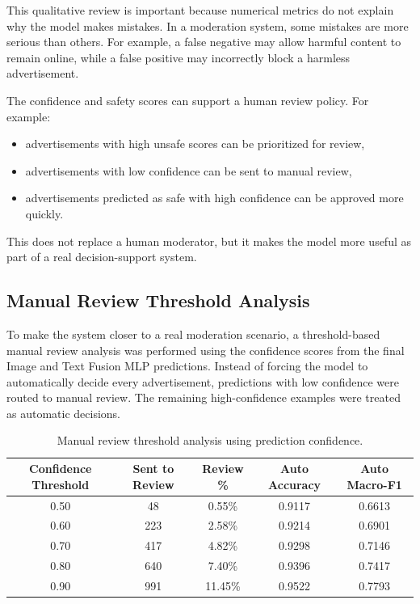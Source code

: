 \documentclass[12pt]{article}
\begin{document}
This qualitative review is important because numerical metrics do not explain why the model makes mistakes. In a moderation system, some mistakes are more serious than others. For example, a false negative may allow harmful content to remain online, while a false positive may incorrectly block a harmless advertisement.

The confidence and safety scores can support a human review policy. For example:
\begin{itemize}
    \item advertisements with high unsafe scores can be prioritized for review,
    \item advertisements with low confidence can be sent to manual review,
    \item advertisements predicted as safe with high confidence can be approved more quickly.
\end{itemize}

This does not replace a human moderator, but it makes the model more useful as part of a real decision-support system.

\subsection{Manual Review Threshold Analysis}

To make the system closer to a real moderation scenario, a threshold-based manual review analysis was performed using the confidence scores from the final Image and Text Fusion MLP predictions. Instead of forcing the model to automatically decide every advertisement, predictions with low confidence were routed to manual review. The remaining high-confidence examples were treated as automatic decisions.

\begin{table}[H]
\centering
\begin{tabular}{ccccc}
\toprule
\textbf{Confidence Threshold} & \textbf{Sent to Review} & \textbf{Review \%} & \textbf{Auto Accuracy} & \textbf{Auto Macro-F1} \\
\midrule
0.50 & 48 & 0.55\% & 0.9117 & 0.6613 \\
0.60 & 223 & 2.58\% & 0.9214 & 0.6901 \\
0.70 & 417 & 4.82\% & 0.9298 & 0.7146 \\
0.80 & 640 & 7.40\% & 0.9396 & 0.7417 \\
0.90 & 991 & 11.45\% & 0.9522 & 0.7793 \\
\bottomrule
\end{tabular}
\caption{Manual review threshold analysis using prediction confidence.}
\label{tab:manual_review}
\end{table}
\end{document}
